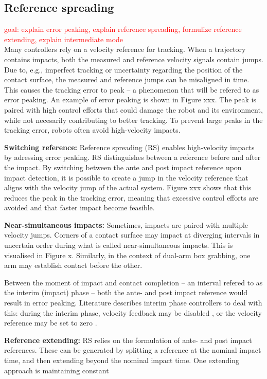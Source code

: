 \documentclass[a4paper, 10pt, conference]{ieeeconf}
\begin{document}
    \subsection{Reference spreading}
     \textcolor{red}{goal: explain error peaking, explain reference spreading, formulize reference extending, explain intermediate mode }\\
   Many controllers rely on a velocity reference for tracking. When a trajectory contains impacts, both the measured and reference velocity signals contain jumps. Due to, e.g., imperfect tracking or uncertainty regarding the position of the contact surface, the measured and reference jumps can be misaligned in time. This causes the tracking error to peak -- a phenomenon that will be refered to as error peaking. An example of error peaking is shown in Figure xxx. The peak is paired with high control efforts that could damage the robot and its environment, while not necesarily contributing to better tracking. To prevent large peaks in the tracking error, robots often avoid high-velocity impacts.

    \textbf{Switching reference:} Reference spreading (RS) enables high-velocity impacts by adressing error peaking. RS distinguishes between a reference before and after the impact. By switching between the ante and post impact reference upon impact detection, it is possible to create a jump in the velocity reference that aligns with the velocity jump of the actual system. Figure xxx shows that this reduces the peak in the tracking error, meaning that excessive control efforts are avoided and that faster impact become feasible.

   \textbf{Near-simultaneous impacts:} Sometimes, impacts are paired with multiple velocity jumps.  Corners of a contact surface may impact at diverging intervals in uncertain order during what is called near-simultaneous impacts. This is visualised in Figure x. Similarly, in the context of dual-arm box grabbing, one arm may establish contact before the other.

   Between the moment of impact and contact completion -- an interval refered to as the interim (impact) phase -- both the ante- and post impact reference would result in error peaking. Literature describes interim phase controllers to deal with this: during the interim phase, velocity feedback may be disabled \cite{vansteenRobotControlSimultaneous2021}, or the velocity reference may be set to zero \cite{uitendaalTeachingRobotsInteraction2022}. 

   \textbf{Reference extending:} RS relies on the formulation of  ante- and post impact references. These can be generated by splitting a reference at the nominal impact time, and then extending beyond the nominal impact time. One extending approach is maintaining constant 
\end{document}
